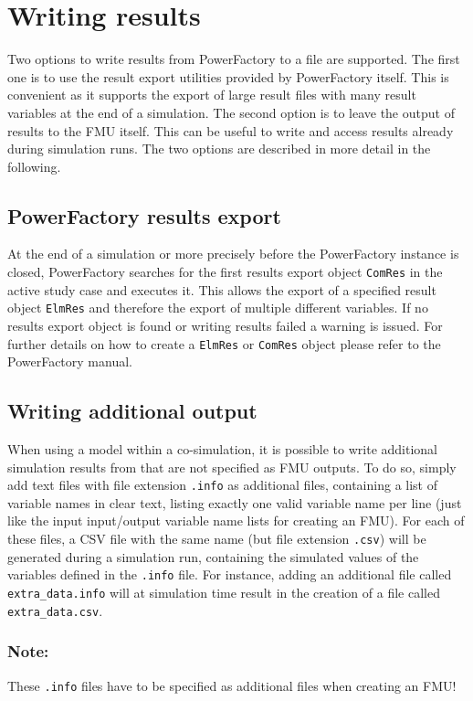 \chapter{Writing results}
\label{sec:additional_output}

Two options to write results from PowerFactory to a file are supported.
The first one is to use the result export utilities provided by PowerFactory itself.
This is convenient as it supports the export of large result files with many result variables at the end of a simulation.
The second option is to leave the output of results to the FMU itself.
This can be useful to write and access results already during simulation runs.
The two options are described in more detail in the following.

\section{PowerFactory results export}
At the end of a simulation or more precisely before the PowerFactory instance is closed, PowerFactory searches for the first results export object \texttt{ComRes} in the active study case and executes it.
This allows the export of a specified result object \texttt{ElmRes} and therefore the export of multiple different variables.
If no results export object is found or writing results failed a warning is issued.
For further details on how to create a \texttt{ElmRes} or \texttt{ComRes} object please refer to the PowerFactory manual.

\section{Writing additional output}
When using a \pf model within a co-simulation, it is possible to write additional simulation results from \pf that are not specified as FMU outputs.
To do so, simply add text files with file extension \texttt{.info} as additional files, containing a list of variable names in clear text, listing exactly one valid variable name per line (just like the input input/output variable name lists for creating an FMU).
For each of these files, a CSV file with the same name (but file extension \texttt{.csv}) will be generated during a simulation run, containing the simulated values of the variables defined in the \texttt{.info} file.
For instance, adding an additional file called \texttt{extra\_data.info} will at simulation time result in the creation of a file called \texttt{extra\_data.csv}.

\subsection*{Note:}
These \texttt{.info} files have to be specified as additional files when creating an FMU!